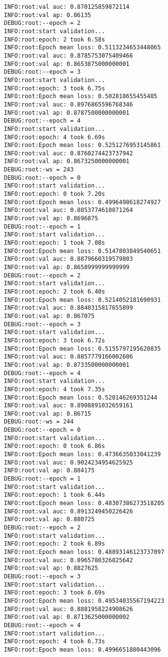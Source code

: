 \documentclass[11pt]{article}
\begin{document}
\begin{verbatim}
INFO:root:val auc: 0.870125859872114
INFO:root:val ap: 0.86135
DEBUG:root:--epoch = 2
INFO:root:start validation...
INFO:root:epoch: 2 took 6.58s
INFO:root:Epoch mean loss: 0.5113234653448065
INFO:root:val auc: 0.8785753075409466
INFO:root:val ap: 0.8653875000000001
DEBUG:root:--epoch = 3
INFO:root:start validation...
INFO:root:epoch: 3 took 6.75s
INFO:root:Epoch mean loss: 0.502818655455485
INFO:root:val auc: 0.8976865596768346
INFO:root:val ap: 0.8787500000000001
DEBUG:root:--epoch = 4
INFO:root:start validation...
INFO:root:epoch: 4 took 6.69s
INFO:root:Epoch mean loss: 0.5251276953145861
INFO:root:val auc: 0.8760274423737942
INFO:root:val ap: 0.8673250000000001
DEBUG:root:-ws = 243
DEBUG:root:--epoch = 0
INFO:root:start validation...
INFO:root:epoch: 0 took 7.20s
INFO:root:Epoch mean loss: 0.4996498618274927
INFO:root:val auc: 0.8853774610871264
INFO:root:val ap: 0.8696875
DEBUG:root:--epoch = 1
INFO:root:start validation...
INFO:root:epoch: 1 took 7.08s
INFO:root:Epoch mean loss: 0.5147803849540651
INFO:root:val auc: 0.8879660319579803
INFO:root:val ap: 0.8658999999999999
DEBUG:root:--epoch = 2
INFO:root:start validation...
INFO:root:epoch: 2 took 6.40s
INFO:root:Epoch mean loss: 0.5214052181690931
INFO:root:val auc: 0.8840315817655899
INFO:root:val ap: 0.867075
DEBUG:root:--epoch = 3
INFO:root:start validation...
INFO:root:epoch: 3 took 6.72s
INFO:root:Epoch mean loss: 0.5155797195620835
INFO:root:val auc: 0.8857779166002606
INFO:root:val ap: 0.8733500000000001
DEBUG:root:--epoch = 4
INFO:root:start validation...
INFO:root:epoch: 4 took 7.35s
INFO:root:Epoch mean loss: 0.520146269351244
INFO:root:val auc: 0.8908891032659161
INFO:root:val ap: 0.86715
DEBUG:root:-ws = 244
DEBUG:root:--epoch = 0
INFO:root:start validation...
INFO:root:epoch: 0 took 6.86s
INFO:root:Epoch mean loss: 0.4736635033041239
INFO:root:val auc: 0.9024234954625925
INFO:root:val ap: 0.884175
DEBUG:root:--epoch = 1
INFO:root:start validation...
INFO:root:epoch: 1 took 6.44s
INFO:root:Epoch mean loss: 0.48307386273518205
INFO:root:val auc: 0.8913249450226426
INFO:root:val ap: 0.880725
DEBUG:root:--epoch = 2
INFO:root:start validation...
INFO:root:epoch: 2 took 6.89s
INFO:root:Epoch mean loss: 0.48893146123737097
INFO:root:val auc: 0.8965780326825642
INFO:root:val ap: 0.8827625
DEBUG:root:--epoch = 3
INFO:root:start validation...
INFO:root:epoch: 3 took 6.69s
INFO:root:Epoch mean loss: 0.49534035567194223
INFO:root:val auc: 0.8881958224908626
INFO:root:val ap: 0.8713625000000002
DEBUG:root:--epoch = 4
INFO:root:start validation...
INFO:root:epoch: 4 took 6.73s
INFO:root:Epoch mean loss: 0.4996651880443096

\end{verbatim}
\end{document}
